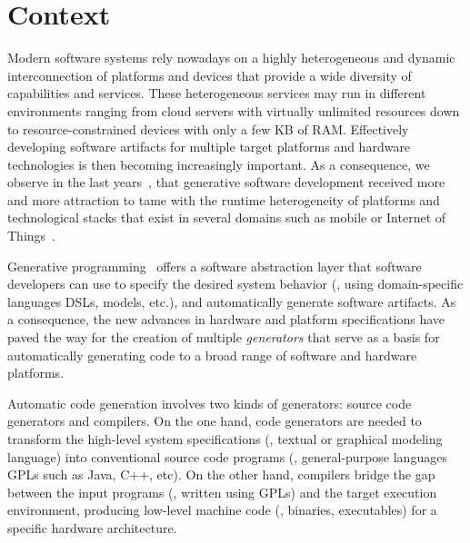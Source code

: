 

\section{Context}
Modern software systems rely nowadays on a highly heterogeneous and dynamic interconnection of platforms and devices that provide a wide diversity of capabilities and services. These heterogeneous services may run in different environments ranging from cloud servers with virtually unlimited resources down to resource-constrained devices with only a few KB of RAM. Effectively developing software artifacts for multiple target platforms and hardware technologies is then becoming increasingly important. As a consequence, we observe in the last years~\cite{Czarnecki:2000:GPM:345203}, that generative software development received more and more attraction to tame with the runtime heterogeneity of platforms and technological stacks that exist in several domains such as mobile or Internet of Things~\cite{betz2011improving}.

Generative programming~\cite{czarnecki2000generative} offers a software abstraction layer that software developers can use to specify the desired system behavior (\eg, using domain-specific languages DSLs, models, etc.), and automatically generate software artifacts. As a consequence, the new advances in hardware and platform specifications have paved the way for the creation of multiple \textit{generators} that serve as a basis for automatically generating code to a broad range of software and hardware platforms. 


Automatic code generation involves two kinds of generators: source code generators and compilers.
On the one hand, code generators are needed to transform the high-level system specifications (\eg, textual or graphical modeling language) into conventional source code programs (\eg, general-purpose languages GPLs such as Java, C++, etc). 
On the other hand, compilers bridge the gap between the input programs (\ie, written using GPLs) and the target execution environment, producing low-level machine code (\ie, binaries, executables) for a specific hardware architecture.



